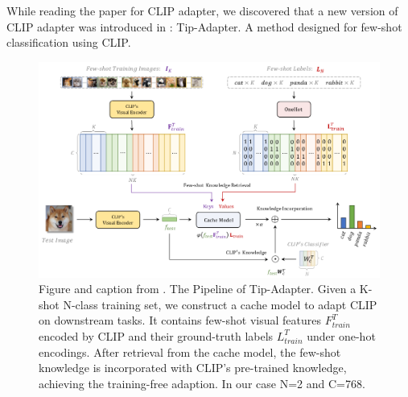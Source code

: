 \documentclass[12pt,a4paper]{article}
\begin{document}
While reading the paper for CLIP adapter, we discovered that a new version of CLIP adapter was introduced in \autocite*{zhangTipAdapterTrainingfreeAdaption2022}: Tip-Adapter. A method designed for few-shot classification using CLIP.

\begin{figure}[H]
    \includegraphics*[width=\textwidth]{img/tip_adapter.png}
    \caption{Figure and caption from \autocite*{khanCLIPpingDeceptionAdapting2024}. The Pipeline of Tip-Adapter. Given a K-shot N-class training set, we construct a cache model to adapt CLIP on downstream tasks. It contains few-shot visual features $F^T_{train}$ encoded by CLIP and their ground-truth labels $L^T_{train}$ under one-hot encodings. After retrieval from the cache model, the few-shot knowledge is incorporated with CLIP’s pre-trained knowledge, achieving the training-free adaption. In our case N=2 and C=768.}
    \label{fig:tip}
\end{figure}

\newcommand\ft{$F_{train}$}
\newcommand\lt{$L_{train}$}
\end{document}
